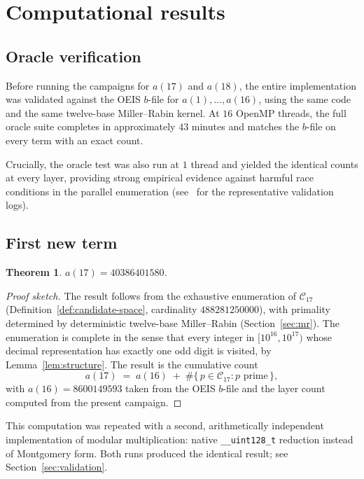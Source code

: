 \documentclass[11pt,a4paper]{article}
\newtheorem{theorem}{Theorem}
\theoremstyle{definition}
\begin{document}
\section{Computational results}\label{sec:results}

\subsection{Oracle verification}\label{sec:oracle}

Before running the campaigns for $a(17)$ and $a(18)$, the entire
implementation was validated against the OEIS $b$-file for
$a(1), \ldots, a(16)$, using the same code and the same twelve-base
Miller--Rabin kernel. At $16$ OpenMP threads, the full oracle suite
completes in approximately $43$ minutes and matches the $b$-file
on every term with an exact count.

Crucially, the oracle test was also run at $1$ thread and yielded the
identical counts at every layer, providing strong empirical evidence
against harmful race conditions in the parallel enumeration
(see~\cite{Repo} for the representative validation logs).

\subsection{First new term}

\begin{theorem}\label{thm:a17}
$a(17) = \num{40386401580}$.
\end{theorem}

\begin{proof}[Proof sketch]
The result follows from the exhaustive enumeration of $\mathcal{C}_{17}$
(Definition~\ref{def:candidate-space}, cardinality $\num{488281250000}$),
with primality determined by deterministic twelve-base Miller--Rabin
(Section~\ref{sec:mr}). The enumeration is complete in the sense that every
integer in $[10^{16}, 10^{17})$ whose decimal representation has exactly one
odd digit is visited, by Lemma~\ref{lem:structure}. The result is the
cumulative count
\[
  a(17) \;=\; a(16) \;+\; \#\{\, p \in \mathcal{C}_{17} : p \text{ prime}\,\},
\]
with $a(16) = \num{8600149593}$ taken from the OEIS $b$-file and the layer
count computed from the present campaign.
\end{proof}

This computation was repeated with a second, arithmetically independent
implementation of modular multiplication: native \texttt{\_\_uint128\_t}
reduction instead of Montgomery form. Both runs produced the identical
result; see Section~\ref{sec:validation}.
\end{document}
